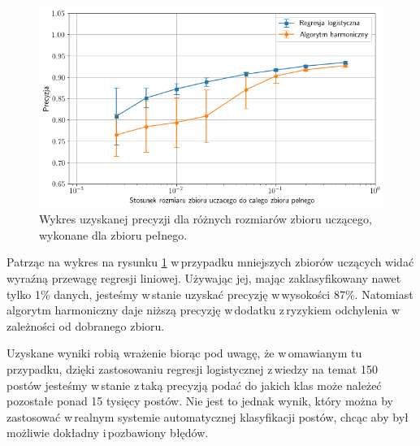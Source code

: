 \begin{figure}[!h]

	\centering \includegraphics[width=0.95\linewidth]{img/results/wyniki-pelen.png}
	\caption{Wykres uzyskanej precyzji dla różnych rozmiarów zbioru uczącego, wykonane dla zbioru pełnego.}	\label{fig:wyniki-pelen}
\end{figure}
\par
Patrząc na wykres na rysunku \ref{fig:wyniki-pelen} w\,przypadku mniejszych zbiorów uczących widać wyraźną przewagę regresji liniowej. Używając jej, mając zaklasyfikowany nawet tylko 1\% danych, jesteśmy w\,stanie uzyskać precyzję w\,wysokości 87\%. Natomiast algorytm harmoniczny daje niższą precyzję w\,dodatku z\,ryzykiem odchylenia w\,zależności od dobranego zbioru. 
\par
Uzyskane wyniki robią wrażenie biorąc pod uwagę, że w\,omawianym tu przypadku, dzięki zastosowaniu regresji logistycznej z\,wiedzy na temat 150 postów jesteśmy w\,stanie z\,taką precyzją podać do jakich klas może należeć pozostałe ponad 15 tysięcy postów. Nie jest to jednak wynik, który można by zastosować w\,realnym systemie automatycznej klasyfikacji postów, chcąc aby był możliwie dokładny i\,pozbawiony błędów. 



